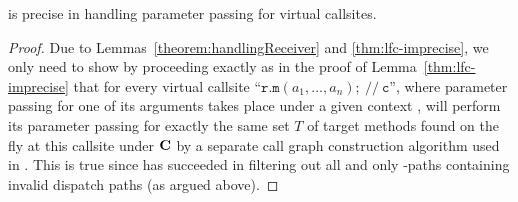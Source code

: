 \begin{comment}


\begin{lemma}
\vspace*{-.3ex}
\begin{lemma} \label{theorem:ContextRecovery}
At every virtual callsite,  \LFCR passes arguments into and receives return values from 
 exactly the same set of target methods found at the callsite as \manuLFCDD does.
\end{lemma}
\vspace*{-1.8ex}
\begin{proof}[Proof Sketch]
\LR filters out all and only \LFC-paths  containing invalid
dispatch paths (discussed and proved above), \LFCR will perform its
parameter passing for exactly the same set $T$ of target methods defined there.
\end{proof}
\end{lemma}
\end{comment}

\begin{thm}
\label{thm:LFCR-correctness}
\LFCR is precise in handling parameter passing for virtual callsites.
\end{thm}
\begin{proof}
Due to Lemmas~\ref{theorem:handlingReceiver} and \ref{thm:lfc-imprecise},
we only need to show by proceeding exactly as in the proof of Lemma~\ref{thm:lfc-imprecise} that for every virtual callsite 
``$\mathtt{r}.\mathtt{m}(a_1, \dots, a_n); ~ // ~ \mathtt{c}$'',
where parameter passing for
one of its arguments takes place under a given context \CC, 
\LFCR will perform its
parameter passing  for exactly the same set $T$ of target methods found
on the fly at this callsite under $\textbf{C}$ by a separate call graph
construction algorithm used in \manuLFC. This is true
since 
\LR has succeeded in filtering out all and only \LFC-paths  containing invalid
dispatch paths (as argued above).
\end{proof}



